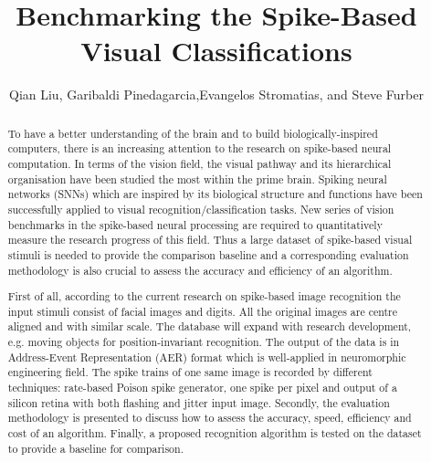 \documentclass[pdftex]{bioinfo}
\def\firstAuthorLast{Qian Liu {et~al.}} %
\def\Authors{Qian Liu, Garibaldi Pinedagarcia,Evangelos Stromatias, and Steve Furber}
\def\Address{SpiNNaker, Advanced Processor Technologies Research Group, School of Computer Science, University of Manchester, Manchester, United Kingdom}
\begin{document}

\title[Benchmarking the Spike-Based Visual Classifications]{Benchmarking the Spike-Based Visual Classifications}
\author[\firstAuthorLast ]{\Authors}
\address{\Address}
\history{}

\editor{}


\maketitle
\begin{abstract}

To have a better understanding of the brain and to build biologically-inspired computers, there is an increasing attention to the research on spike-based neural computation.
In terms of the vision field, the visual pathway and its hierarchical organisation have been studied the most within the prime brain.
Spiking neural networks (SNNs) which are inspired by its biological structure and functions have been successfully applied to visual recognition/classification tasks.
New series of vision benchmarks in the spike-based neural processing are required to quantitatively measure the research progress of this field.
Thus a large dataset of spike-based visual stimuli is needed to provide the comparison baseline and a corresponding evaluation methodology is also crucial to assess the accuracy and efficiency of an algorithm.

First of all, according to the current research on spike-based image recognition the input stimuli consist of facial images and digits.
All the original images are centre aligned and with similar scale.
The database will expand with research development, e.g. moving objects for position-invariant recognition.
The output of the data is in Address-Event Representation (AER) format which is well-applied in neuromorphic engineering field.
The spike trains of one same image is recorded by different techniques: rate-based Poison spike generator, one spike per pixel and output of a silicon retina with both flashing and jitter input image.
Secondly, the evaluation methodology is presented to discuss how to assess the accuracy, speed, efficiency and cost of an algorithm.
Finally, a proposed recognition algorithm is tested on the dataset to provide a baseline for comparison.


\end{abstract}
\end{document}
